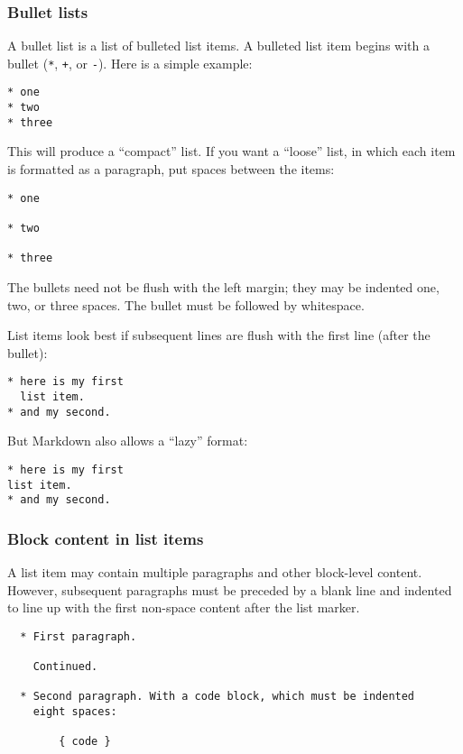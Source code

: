 \documentclass[
]{article}
\begin{document}
\subsubsection{Bullet lists}\label{bullet-lists}

A bullet list is a list of bulleted list items. A bulleted list item
begins with a bullet (\texttt{*}, \texttt{+}, or \texttt{-}). Here is a
simple example:

\begin{verbatim}
* one
* two
* three
\end{verbatim}

This will produce a ``compact'' list. If you want a ``loose'' list, in
which each item is formatted as a paragraph, put spaces between the
items:

\begin{verbatim}
* one

* two

* three
\end{verbatim}

The bullets need not be flush with the left margin; they may be indented
one, two, or three spaces. The bullet must be followed by whitespace.

List items look best if subsequent lines are flush with the first line
(after the bullet):

\begin{verbatim}
* here is my first
  list item.
* and my second.
\end{verbatim}

But Markdown also allows a ``lazy'' format:

\begin{verbatim}
* here is my first
list item.
* and my second.
\end{verbatim}

\subsubsection{Block content in list
items}\label{block-content-in-list-items}

A list item may contain multiple paragraphs and other block-level
content. However, subsequent paragraphs must be preceded by a blank line
and indented to line up with the first non-space content after the list
marker.

\begin{verbatim}
  * First paragraph.

    Continued.

  * Second paragraph. With a code block, which must be indented
    eight spaces:

        { code }
\end{verbatim}
\end{document}
